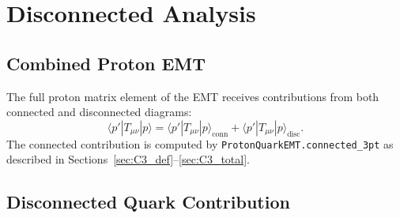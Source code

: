 \documentclass[11pt,a4paper]{article}
\newcommand{\Tmunu}{T_{\mu\nu}}
\begin{document}
\section{Disconnected Analysis}

\subsection{Combined Proton EMT}

The full proton matrix element of the EMT receives contributions from both
connected and disconnected diagrams:
\begin{equation}
  \langle p'|\Tmunu|p\rangle
  = \langle p'|\Tmunu|p\rangle_{\text{conn}}
  + \langle p'|\Tmunu|p\rangle_{\text{disc}}.
\end{equation}
The connected contribution is computed by \texttt{ProtonQuarkEMT.connected\_3pt}
as described in Sections~\ref{sec:C3_def}--\ref{sec:C3_total}.

\subsection{Disconnected Quark Contribution}
\label{sec:proton_disc_full_volume_source}
\end{document}

